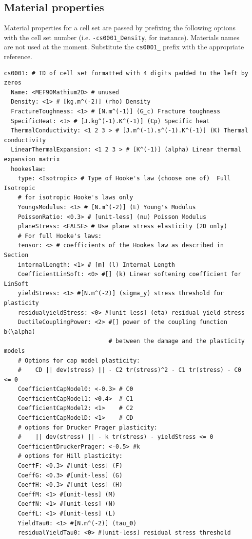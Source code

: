 \documentclass[10pt,oneside]{report}
\begin{document}
\subsection{Material properties}
\label{sec:MatProp}
Material properties for a cell set are passed by prefixing the following options with the cell set number (i.e. \verb+-cs0001_Density+, for instance). Materials names are not used at the moment. Substitute the \verb+cs0001_+ prefix with the appropriate reference.

\begin{verbatim}
cs0001: # ID of cell set formatted with 4 digits padded to the left by zeros
  Name: <MEF90Mathium2D> # unused  
  Density: <1> # [kg.m^(-2)] (rho) Density 
  FractureToughness: <1> # [N.m^(-1)] (G_c) Fracture toughness 
  SpecificHeat: <1> # [J.kg^(-1).K^(-1)] (Cp) Specific heat 
  ThermalConductivity: <1 2 3 > # [J.m^(-1).s^(-1).K^(-1)] (K) Thermal conductivity 
  LinearThermalExpansion: <1 2 3 > # [K^(-1)] (alpha) Linear thermal expansion matrix 
  hookeslaw:
    type: <Isotropic> # Type of Hooke's law (choose one of)  Full Isotropic
    # for isotropic Hooke's laws only
    YoungsModulus: <1> # [N.m^(-2)] (E) Young's Modulus 
    PoissonRatio: <0.3> # [unit-less] (nu) Poisson Modulus 
    planeStress: <FALSE> # Use plane stress elasticity (2D only)
    # For full Hooke's laws:
    tensor: <> # coefficients of the Hookes law as described in Section 
    internalLength: <1> # [m] (l) Internal Length 
    CoefficientLinSoft: <0> #[] (k) Linear softening coefficient for LinSoft 
    yieldStress: <1> #[N.m^(-2)] (sigma_y) stress threshold for plasticity 
    residualyieldStress: <0> #[unit-less] (eta) residual yield stress 
    DuctileCouplingPower: <2> #[] power of the coupling function b(\alpha) 
                              # between the damage and the plasticity models
    # Options for cap model plasticity:
    #    CD || dev(stress) || - C2 tr(stress)^2 - C1 tr(stress) - C0 <= 0
    CoefficientCapModel0: <-0.3> # C0
    CoefficientCapModel1: <0.4>  # C1 
    CoefficientCapModel2: <1>    # C2
    CoefficientCapModelD: <1>    # CD
    # options for Drucker Prager plasticity:
    #    || dev(stress) || - k tr(stress) - yieldStress <= 0
    CoefficientDruckerPrager: <-0.5> #k 
    # options for Hill plasticity:
    CoeffF: <0.3> #[unit-less] (F) 
    CoeffG: <0.3> #[unit-less] (G) 
    CoeffH: <0.3> #[unit-less] (H) 
    CoeffM: <1> #[unit-less] (M) 
    CoeffN: <1> #[unit-less] (N) 
    CoeffL: <1> #[unit-less] (L)
    YieldTau0: <1> #[N.m^(-2)] (tau_0) 
    residualYieldTau0: <0> #[unit-less] residual stress threshold

\end{verbatim}
\end{document}
